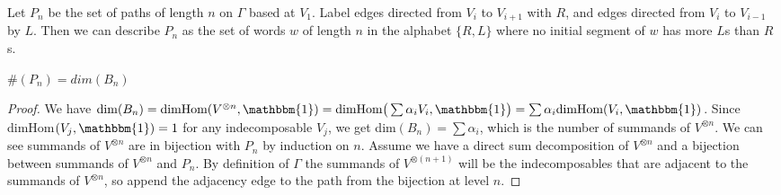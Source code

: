 \documentclass[11pt]{article} %
\begin{document}

\begin{mydef}
Let $P_n$ be the set of paths of length $n$ on $\Gamma$ based at $V_1$. Label edges directed from $V_i$ to $V_{i+1}$ with $R$, and edges directed from $V_{i}$ to $V_{i-1}$ by $L$. Then we can describe $P_n$ as the set of words $w$ of length $n$ in the alphabet $\{R,L\}$ where no initial segment of $w$ has more $L$s than $R$s.
\end{mydef}

\begin{prop}
$\#(P_n)=dim(B_n)$
\end{prop}

\begin{proof}
  We have $\dim(B_n)=\text{dimHom}(V^{\otimes n},\mathbbm{1})=\text{dimHom} \big( \sum{\alpha_i V_i,\mathbbm{1} \big) }=\sum{\alpha_i \text{dimHom}(V_i,\mathbbm{1})}$. Since dimHom$(V_j, \mathbbm{1}) = 1$ for any indecomposable $V_j$, we get dim$(B_n)=\sum{\alpha_i}$, which is the number of summands of $V^{\otimes n}$. We can see summands of $V^{\otimes n}$ are in bijection with $P_n$ by induction on $n$. Assume we have a direct sum decomposition of $V^{\otimes n}$ and a bijection between summands of $V^{\otimes n}$ and $P_n$. By definition of $\Gamma$ the summands of $V^{\otimes (n+1)}$ will be the indecomposables that are adjacent to the summands of $V^{\otimes n}$, so append the adjacency edge to the path from the bijection at level $n$.
\end{proof}
\end{document}
